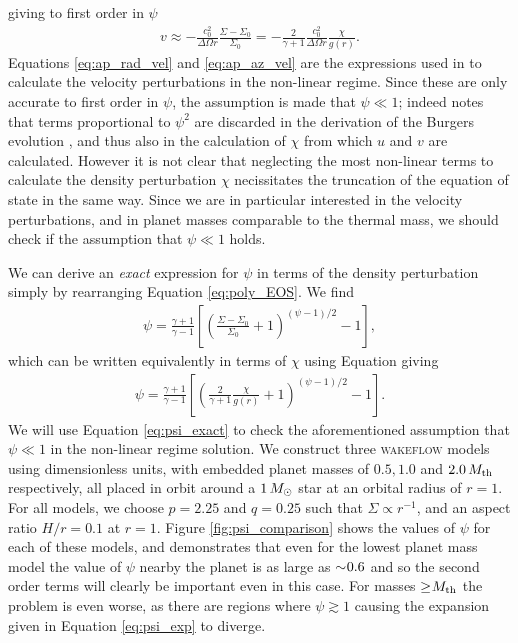 giving to first order in $\psi$
\begin{align}
    v \approx - \frac{c_0^2}{\Delta \Omega r} \frac{\Sigma - \Sigma_0}{\Sigma_0} = - \frac{2}{\gamma + 1} \frac{c_0^2}{\Delta \Omega r} \frac{\chi}{g(r)}. \label{eq:ap_az_vel}
\end{align}
Equations \ref{eq:ap_rad_vel} and \ref{eq:ap_az_vel} are the expressions used in \citet{bollati2021} to calculate the velocity perturbations in the non-linear regime. 
Since these are only accurate to first order in $\psi$, the assumption is made that $\psi \ll 1$; indeed \citet{bollati2021} notes that terms proportional to $\psi^2$ are discarded in the derivation of the Burgers evolution \feqr, and thus also in the calculation of $\chi$ from which $u$ and $v$ are calculated. 
However it is not clear that neglecting the most non-linear terms to calculate the density perturbation $\chi$ necissitates the truncation of the equation of state in the same way. 
Since we are in particular interested in the velocity perturbations, and in planet masses comparable to the thermal mass, we should check if the assumption that $\psi \ll 1$ holds.

We can derive an \textit{exact} expression for $\psi$ in terms of the density perturbation simply by rearranging Equation \ref{eq:poly_EOS}. We find
\begin{align}
    \psi = \frac{\gamma + 1}{\gamma - 1} \left[ \left( \frac{\Sigma-\Sigma_0}{\Sigma_0} +1  \right)^{(\psi-1)/2}  -1 \right],
\end{align}
which can be written equivalently in terms of $\chi$ using Equation \feqr giving
\begin{align}
    \psi = \frac{\gamma + 1}{\gamma - 1} \left[ \left( \frac{2}{\gamma + 1} \frac{\chi}{g(r)} +1  \right)^{(\psi-1)/2} -1 \right]. \label{eq:psi_exact}
\end{align}
We will use Equation \ref{eq:psi_exact} to check the aforementioned assumption that $\psi \ll 1$ in the non-linear regime solution. 
We construct three \textsc{wakeflow} models using dimensionless units, with embedded planet masses of $0.5, 1.0$ and $2.0 \, M_{\rm{th}}$ respectively, all placed in orbit around a $1 \, M_{\rm{\odot}}$ star at an orbital radius of $r=1$. 
For all models, we choose $p=2.25$ and $q=0.25$ such that $\Sigma \propto r^{-1}$, and an aspect ratio $H/r=0.1$ at $r=1$. 
Figure \ref{fig:psi_comparison} shows the values of $\psi$ for each of these models, and demonstrates that even for the lowest planet mass model the value of $\psi$ nearby the planet is as large as $\sim \hspace{-0.23em} 0.6$ and so the second order terms will clearly be important even in this case. 
For masses $\ge \hspace{-0.23em} M_\mathrm{th}$ the problem is even worse, as there are regions where $\psi \gtrsim 1$ causing the expansion given in Equation \ref{eq:psi_exp} to diverge.

